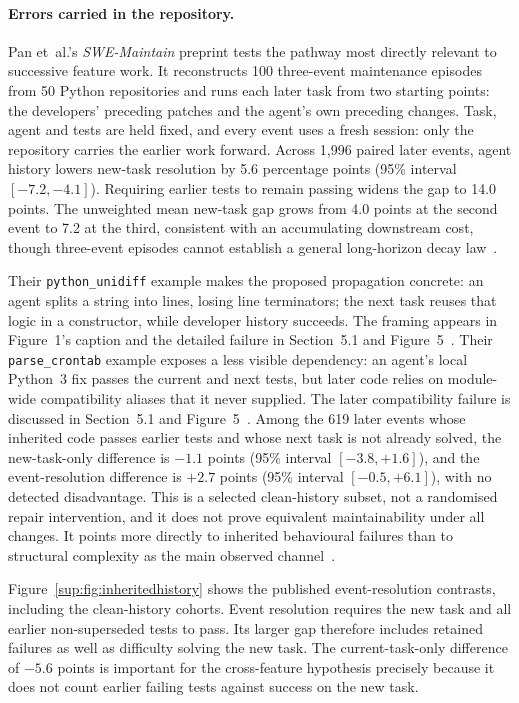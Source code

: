 \paragraph{Errors carried in the repository.}
Pan et~al.'s \emph{SWE-Maintain} preprint tests the pathway most directly
relevant to successive feature work. It reconstructs 100 three-event
maintenance episodes from 50 Python
repositories and runs each later task from two starting points: the developers'
preceding patches and the agent's own preceding changes. Task, agent and tests
are held fixed, and every event uses a fresh session: only the repository
carries the earlier work forward. Across 1,996 paired later events, agent
history lowers new-task resolution by 5.6 percentage points (95\% interval
$[-7.2,-4.1]$). Requiring earlier tests to remain passing widens the gap to
14.0 points. The unweighted mean new-task gap grows from 4.0 points at the second
event to 7.2 at the third, consistent with an accumulating downstream cost,
though three-event episodes cannot establish a general long-horizon decay
law~\cite[Secs.~2.5 and~4.1, Table~2]{pan2026swemaintain}.

Their \texttt{python\_unidiff} example makes the proposed propagation concrete:
an agent splits a string into lines, losing line terminators; the next
task reuses that logic in a constructor, while developer history succeeds.
The framing appears in Figure~1's caption and the detailed failure in
Section~5.1 and Figure~5~\cite{pan2026swemaintain}.
Their \texttt{parse\_crontab} example exposes a less visible dependency:
an agent's local Python~3 fix passes the current and next tests, but later
code relies on module-wide compatibility aliases that it never supplied.
The later compatibility failure is discussed in
Section~5.1 and Figure~5~\cite{pan2026swemaintain}.
Among the 619 later events
whose inherited code passes earlier tests and whose next task is not already
solved, the new-task-only difference is $-1.1$ points (95\% interval
$[-3.8,+1.6]$), and the event-resolution difference is $+2.7$ points (95\% interval
$[-0.5,+6.1]$), with no detected disadvantage. This is a selected clean-history
subset, not a randomised repair intervention, and it does not prove equivalent
maintainability under all changes. It points more directly to inherited
behavioural failures than to structural complexity as the main observed
channel~\cite[Sec.~4.2, Table~3; Sec.~5.1, Fig.~5]{pan2026swemaintain}.

Figure~\ref{sup:fig:inheritedhistory} shows the published event-resolution
contrasts, including the clean-history cohorts. Event resolution requires
the new task and all earlier non-superseded tests to pass. Its larger gap
therefore includes retained failures as well as difficulty solving the new
task. The current-task-only difference of $-5.6$ points is important for the
cross-feature hypothesis precisely because it does not count earlier failing
tests against success on the new task.

